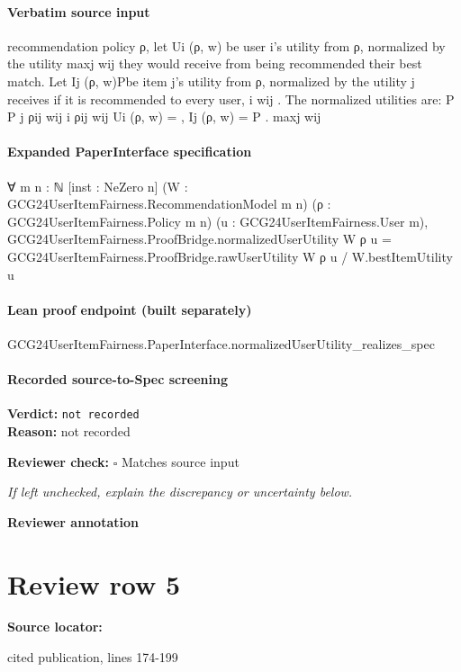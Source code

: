 \documentclass[10pt]{article}
\newcommand{\reviewerbox}{%
  \par\noindent\fbox{\parbox{0.96\linewidth}{\rule{0pt}{0.38in}}}\par
}
\newcommand{\reviewmatch}[1]{%
  \par\noindent\textbf{Reviewer check:} $\square$\; #1\par
  \noindent\emph{If left unchecked, explain the discrepancy or uncertainty below.}\par
}
\begin{document}
\paragraph{Verbatim source input}
\begin{ReviewVerbatim}
recommendation policy ρ, let Ui (ρ, w) be user i’s utility from ρ, normalized by the utility maxj wij
they would receive from being recommended their best match. Let Ij (ρ, w)Pbe item j’s utility from
ρ, normalized by the utility j receives if it is recommended to every user, i wij . The normalized
utilities are:
P
P
j ρij wij
i ρij wij
Ui (ρ, w) =
, Ij (ρ, w) = P
.
maxj wij
\end{ReviewVerbatim}


\paragraph{Expanded PaperInterface specification}
\begin{ReviewVerbatim}
∀ {m n : ℕ} [inst : NeZero n] (W : GCG24UserItemFairness.RecommendationModel m n) (ρ : GCG24UserItemFairness.Policy m n)
  (u : GCG24UserItemFairness.User m),
  GCG24UserItemFairness.ProofBridge.normalizedUserUtility W ρ u =
    GCG24UserItemFairness.ProofBridge.rawUserUtility W ρ u / W.bestItemUtility u
\end{ReviewVerbatim}

\paragraph{Lean proof endpoint (built separately)}\begin{ReviewVerbatim}
GCG24UserItemFairness.PaperInterface.normalizedUserUtility_realizes_spec
\end{ReviewVerbatim}

\paragraph{Recorded source-to-Spec screening}
\textbf{Verdict:} \texttt{not recorded}
\\
\textbf{Reason:} not recorded
\reviewmatch{Matches source input}
\noindent\textbf{Reviewer annotation}\par
\reviewerbox
\clearpage
\hypertarget{source-claim-0dabf0e6dbbf52bf}{}
\section*{Review row 5}
\textbf{Source locator:} {\footnotesize\raggedright cited publication, lines 174-\allowbreak{}199\par}
\end{document}
